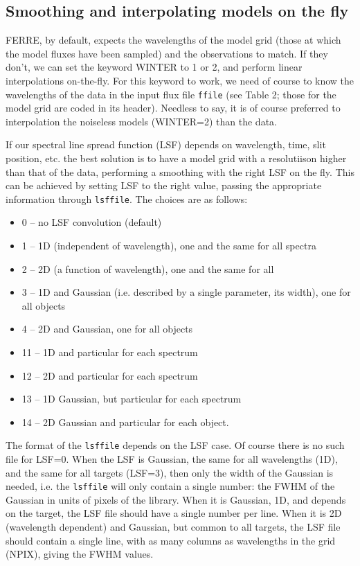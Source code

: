 \documentclass[12pt]{article}
\begin{document}
\subsection{Smoothing and interpolating models on the fly}
\label{sinter}

FERRE, by default, expects the wavelengths of the model grid (those at which
the model fluxes have been sampled) and the observations to match. If they don't,
we can set the keyword WINTER to 1 or 2, and perform linear interpolations
on-the-fly. For this keyword to work, we need of course to know the wavelengths
of the data in the input flux file {\tt ffile} (see Table 2; those for the model
grid are coded in its header).
Needless to say, it is of course preferred to interpolation the noiseless 
models (WINTER=2) than the data.

If our spectral line spread function (LSF) depends on wavelength, time, slit
position, etc. the best solution is to have a model grid with a resolutiison higher
than that of the data, performing a smoothing with the right LSF on the fly.
This can be achieved by setting LSF to the right value, passing the appropriate information
through {\tt lsffile}. The choices are as follows:
\begin{itemize}
\item 0 -- no LSF convolution (default)
\item 1 -- 1D (independent of wavelength), one and the same for all spectra
\item 2 -- 2D (a function of wavelength), one and the same for all
\item 3 -- 1D and Gaussian  (i.e. described by a single parameter, its width), one for all objects
\item 4 -- 2D and Gaussian, one for all objects
\item 11 -- 1D and particular for each spectrum
\item 12 -- 2D and particular for each spectrum
\item 13 -- 1D Gaussian, but particular for each spectrum
\item 14 -- 2D Gaussian and particular for each object.
\end{itemize}

The format of the {\tt lsffile} depends on the LSF case. Of course there is no
such file for LSF=0. When the LSF is Gaussian, the same for all wavelengths (1D), 
and the  same for all targets (LSF=3), then only the width of the Gaussian is needed,
i.e. the {\tt lsffile} will only contain a single number: the FWHM of the Gaussian in
units of pixels of the library. When it is Gaussian, 1D, and
depends on the target, the LSF file should have a single number per line. When it is
2D (wavelength dependent) and Gaussian, but common to all targets, the LSF file should
contain a single line, with as many columns as wavelengths in the grid (NPIX), giving the
FWHM values. 
\end{document}
